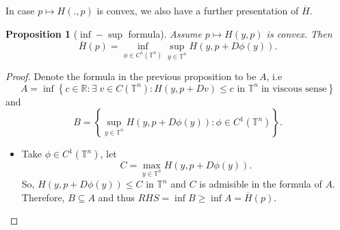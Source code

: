 \documentclass[12pt, oneside]{amsart}  	%
\newtheorem{proposition}{Proposition}
\begin{document}
In case $p\longmapsto H(.,p)$ is convex, we also have a further presentation of $\overline{H}$.
\begin{proposition}[$\inf-\sup$ formula]
Assume $p\mapsto H(y,p)$ is convex. Then
\begin{equation*}
\overline{H}(p)=\inf_{\phi\in C^1(\mathbb{T}^n)} \sup_{y\in \mathbb{T}^n} H(y, p+D\phi(y)).
\end{equation*}
\end{proposition}
\begin{proof} Denote the formula in the previous proposition to be $A$, i.e
\begin{equation*}
A = \inf \left\lbrace c\in \mathbb{R}:\exists\;v\in C(\mathbb{T}^n): H(y, p+Dv)\le c \text{ in }\mathbb{T}^n\;\text{in viscous sense} \right\rbrace
\end{equation*}
and 
\begin{equation*}
B = \left\lbrace \sup_{y\in \mathbb{T}^n} H(y, p+D\phi(y)) : \phi\in C^1(\mathbb{T}^n) \right\rbrace.
\end{equation*}
\begin{itemize}
\item Take $\phi \in C^1(\mathbb{T}^n)$, let 
\begin{equation*}
C=\max_{y\in \mathbb{T}^n} H(y, p + D\phi(y)).
\end{equation*}
So, $H(y, p+D\phi(y)) \le C$ in $\mathbb{T}^n$ and $C$ is admisible in the formula of $A$. Therefore, $B\subseteq A$ and thus
$RHS = \inf B\ge \inf A=\overline{H}(p)$. \\


\end{itemize}
\end{proof}
\end{document}

